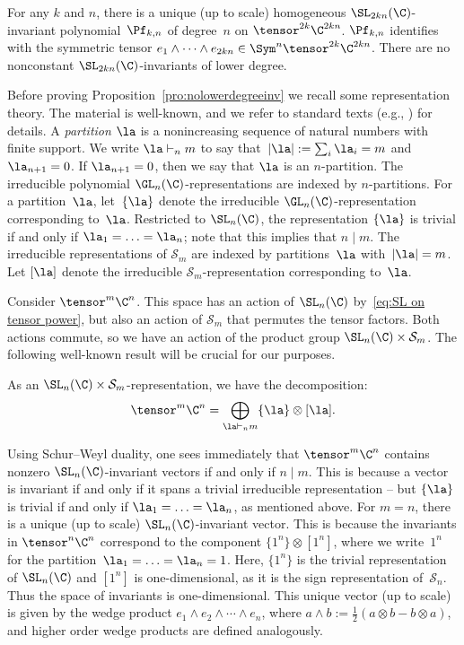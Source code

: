 \begin{proposition}\label{pro:nolowerdegreeinv}
For any $k$ and $n$, there is a unique (up to scale) homogeneous $\SL_{2kn}(\C)$-in\-va\-ri\-ant polynomial~$\Pf_{k,n}$ of degree~$n$ on $\tensor^{2k} \C^{2kn}$.
$\Pf_{k,n}$ identifies with the symmetric tensor $e_1 \wedge \cdots \wedge e_{2kn} \in \Sym^n \tensor^{2k}\C^{2kn}$.
There are no nonconstant $\SL_{2kn}(\C)$-invariants of lower degree.
\end{proposition}

\noindent
Before proving Proposition~\ref{pro:nolowerdegreeinv} we recall some representation theory.
The material is well-known, and we refer to standard texts (e.g., \cite{FH}) for details.
A \emph{partition} $\la$ is a nonincreasing sequence of natural numbers with finite support.
We write $\la \vdash_n m$ to say that~$|\la| := \sum_i \la_i = m$ and $\la_{n+1}=0$.
If $\la_{n+1}=0$, then we say that $\la$ is an $n$-partition.
The irreducible polynomial $\GL_n(\C)$-representations are indexed by $n$-partitions.
For a partition~$\la$, let~$\{\la\}$ denote the irreducible $\GL_n(\C)$-representation corresponding to~$\la$.
Restricted to $\SL_n(\C)$, the representation $\{\la\}$ is trivial if and only if $\la_1=\ldots=\la_n$; note that this implies that $n \mid m$.
The irreducible representations of $\mathcal{S}_m$ are indexed by partitions~$\la$ with~$|\la|=m$.
Let $[\la]$ denote the irreducible $\mathcal{S}_m$-representation corresponding to~$\la$.
%

Consider $\tensor^m \C^n$. This space has an action of $\SL_n(\C)$ by~\eqref{eq:SL on tensor power}, but also an action of $\mathcal{S}_m$ that permutes the tensor factors.
Both actions commute, so we have an action of the product group $\SL_n(\C)\times\mathcal S_m$. The following well-known result will be crucial for our purposes.

\begin{theorem} 
As an $\SL_n(\C) \times \mathcal{S}_m$-representation, we have the decomposition:
\[ 
\tensor^m \C^n = \bigoplus_{\la \vdash_n m} \{\la\}\otimes[\la].
\] 
\end{theorem}

\noindent
Using Schur--Weyl duality, one sees immediately that $\tensor^m \C^n$ contains nonzero $\SL_n(\C)$-invariant vectors if and only if $n \mid m$.
This is because a vector is invariant if and only if it spans a trivial irreducible representation -- but $\{\la\}$ is trivial if and only if $\la_1=\ldots=\la_n$, as mentioned above.
For $m=n$, there is a unique (up to scale) $\SL_n(\C)$-invariant vector.
This is because the invariants in $\tensor^n \C^n$ correspond to the component $\{1^n\} \otimes [1^n]$, where we write~$1^n$ for the partition~$\la_1=\ldots=\la_n=1$.
Here, $\{1^n\}$ is the trivial representation of $\SL_n(\C)$ and $[1^n]$ is one-dimensional, as it is the sign representation of~$\mathcal{S}_n$.
Thus the space of invariants is one-dimensional. This unique vector (up to scale) is given by the wedge product $e_1 \wedge e_2 \wedge \cdots \wedge e_n$, where $a \wedge b := \frac 1 2 (a \otimes b - b \otimes a)$, and higher order wedge products are defined analogously.

